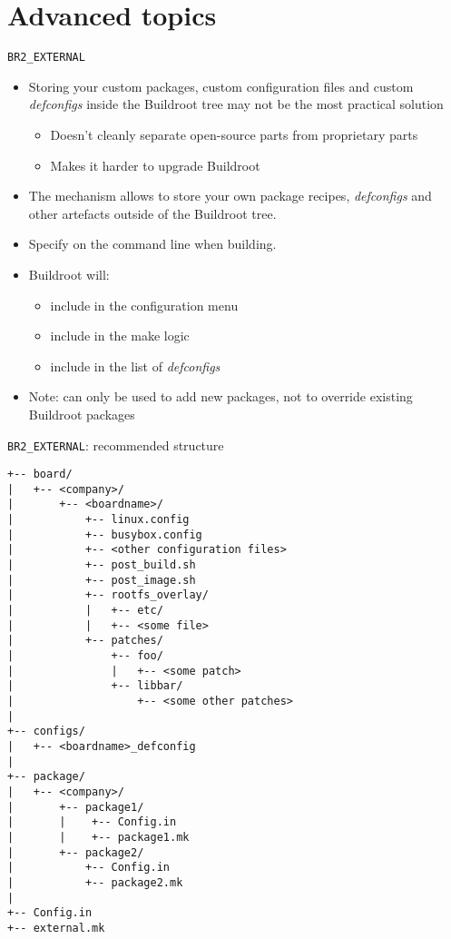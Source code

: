 \section{Advanced topics}

\begin{frame}{{\tt BR2\_EXTERNAL}}
  \begin{itemize}
  \item Storing your custom packages, custom configuration files and
    custom {\em defconfigs} inside the Buildroot tree may not be the
    most practical solution
    \begin{itemize}
    \item Doesn't cleanly separate open-source parts from proprietary parts
    \item Makes it harder to upgrade Buildroot
    \end{itemize}
  \item The  mechanism allows to store your own
    package recipes, {\em defconfigs} and other artefacts outside of
    the Buildroot tree.
  \item Specify  on the command line when building.
  \item Buildroot will:
    \begin{itemize}
    \item include  in the configuration menu
    \item include  in the make logic
    \item include  in the list of {\em defconfigs}
    \end{itemize}
  \item Note: can only be used to add new packages, not to override
    existing Buildroot packages
  \end{itemize}
\end{frame}

\begin{frame}[fragile]{{\tt BR2\_EXTERNAL}: recommended structure}

  \begin{block}{}
    {\tiny
\begin{verbatim}
+-- board/
|   +-- <company>/
|       +-- <boardname>/
|           +-- linux.config
|           +-- busybox.config
|           +-- <other configuration files>
|           +-- post_build.sh
|           +-- post_image.sh
|           +-- rootfs_overlay/
|           |   +-- etc/
|           |   +-- <some file>
|           +-- patches/
|               +-- foo/
|               |   +-- <some patch>
|               +-- libbar/
|                   +-- <some other patches>
|
+-- configs/
|   +-- <boardname>_defconfig
|
+-- package/
|   +-- <company>/
|       +-- package1/
|       |    +-- Config.in
|       |    +-- package1.mk
|       +-- package2/
|           +-- Config.in
|           +-- package2.mk
|
+-- Config.in
+-- external.mk
\end{verbatim}
    }
  \end{block}

\end{frame}


